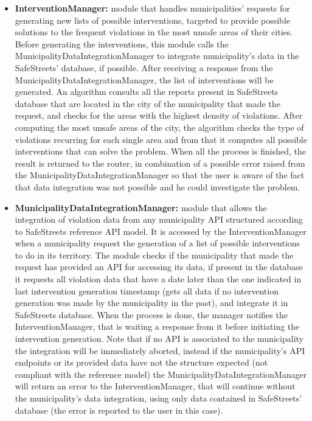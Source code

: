 \begin{itemize}
	\item \textbf{InterventionManager:}
	module that handles municipalities' requests for generating new lists of possible interventions, targeted to provide possible solutions to the frequent violations in the most unsafe areas of their cities. Before generating the interventions, this module calls the MunicipalityDataIntegrationManager to integrate municipality's data in the SafeStreets' database, if possible. After receiving a response from the MunicipalityDataIntegrationManager, the list of interventions will be generated. An algorithm consults all the reports present in SafeStreets database that are located in the city of the municipality that made the request, and checks for the areas with the highest density of violations. After computing the most unsafe areas of the city, the algorithm checks the type of violations recurring for each single area and from that it computes all possible interventions that can solve the problem. When all the process is finished, the result is returned to the router, in combination of a possible error raised from the MunicipalityDataIntegrationManager so that the user is aware of the fact that data integration was not possible and he could investigate the problem.
	\item \textbf{MunicipalityDataIntegrationManager:}
	module that allows the integration of violation data from any municipality API structured according to SafeStreets reference API model. It is accessed by the InterventionManager when a municipality request the generation of a list of possible interventions to do in its territory. The module checks if the municipality that made the request has provided an API for accessing its data, if present in the database it requests all violation data that have a date later than the one indicated in last intervention generation timestamp (gets all data if no intervention generation was made by the municipality in the past), and integrate it in SafeStreets database. When the process is done, the manager notifies the InterventionManager, that is waiting a response from it before initiating the intervention generation. Note that if no API is associated to the municipality the integration will be immediately aborted, instead if the municipality's API endpoints or its provided data have not the structure expected (not compliant with the reference model) the MunicipalityDataIntegrationManager will return an error to the InterventionManager, that will continue without the municipality's data integration, using only data contained in SafeStreets' database (the error is reported to the user in this case).
\end{itemize}


